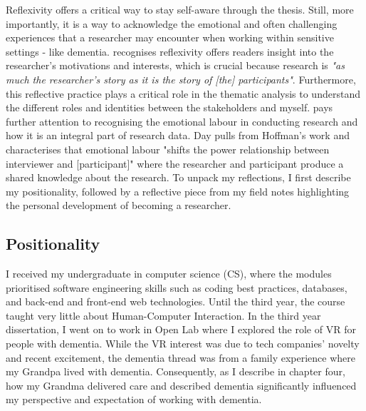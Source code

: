Reflexivity offers a critical way to stay self-aware through the thesis. Still, more importantly, it is a way to acknowledge the emotional and often challenging experiences that a researcher may encounter when working within sensitive settings - like dementia. \cite{corlett2018reflexivity} recognises reflexivity offers readers insight into the researcher's motivations and interests, which is crucial because research is \textit{"as much the researcher's story as it is the story of [the] participants"}. Furthermore, this reflective practice plays a critical role in the thematic analysis to understand the different roles and identities between the stakeholders and myself. \cite{day2012reflexive} pays further attention to recognising the emotional labour in conducting research and how it is an integral part of research data. Day pulls from Hoffman's work and characterises that emotional labour "shifts the power relationship between interviewer and [participant]" where the researcher and participant produce a shared knowledge about the research. To unpack my reflections, I first describe my positionality, followed by a reflective piece from my field notes highlighting the personal development of becoming a researcher.

\subsection{Positionality}
\label{Method:Positionality}
I received my undergraduate in computer science (CS), where the modules prioritised software engineering skills such as coding best practices, databases, and back-end and front-end web technologies. Until the third year, the course taught very little about Human-Computer Interaction. In the third year dissertation, I went on to work in Open Lab where I explored the role of VR for people with dementia. While the VR interest was due to tech companies' novelty and recent excitement, the dementia thread was from a family experience where my Grandpa lived with dementia. Consequently, as I describe in chapter four, how my Grandma delivered care and described dementia significantly influenced my perspective and expectation of working with dementia. 

